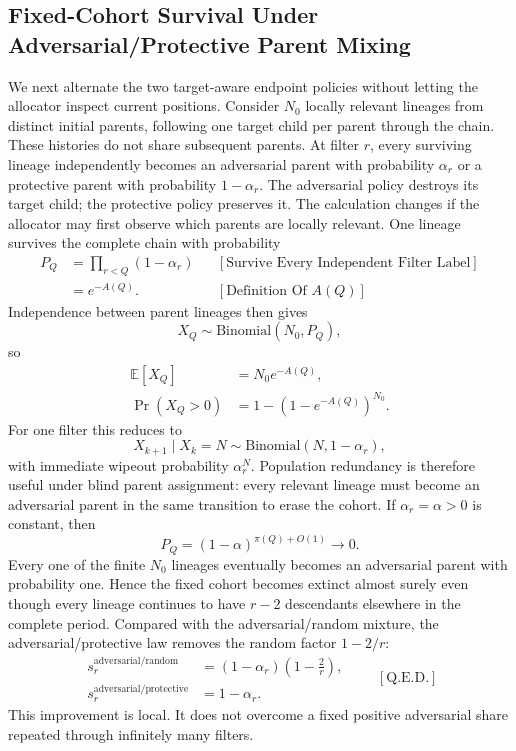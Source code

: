 \subsection{Fixed-Cohort Survival Under Adversarial/Protective Parent Mixing}
We next alternate the two target-aware endpoint policies without letting the allocator inspect current positions. Consider $N_0$ locally relevant lineages from distinct initial parents, following one target child per parent through the chain. These histories do not share subsequent parents. At filter $r$, every surviving lineage independently becomes an adversarial parent with probability $\alpha_r$ or a protective parent with probability $1-\alpha_r$. The adversarial policy destroys its target child; the protective policy preserves it. The calculation changes if the allocator may first observe which parents are locally relevant.
One lineage survives the complete chain with probability
\begin{equation*}
\begin{aligned}
P_Q
&=\prod_{r < Q}(1-\alpha_r)
&&[\text{Survive Every Independent Filter Label}]\\
&=e^{-A(Q)}.
&&[\text{Definition Of }A(Q)]
\end{aligned}
\end{equation*}
Independence between parent lineages then gives
\begin{equation*}
X_Q\sim\text{Binomial}(N_0,P_Q),
\end{equation*}
so
\begin{equation*}
\begin{aligned}
\mathbb E[X_Q]&=N_0e^{-A(Q)},\\
\Pr(X_Q > 0)&=1-\left(1-e^{-A(Q)}\right)^{N_0}.
\end{aligned}
\end{equation*}
For one filter this reduces to
\begin{equation*}
X_{k+1}\mid X_k=N
\sim
\text{Binomial}(N,1-\alpha_r),
\end{equation*}
with immediate wipeout probability $\alpha_r^N$. Population redundancy is therefore useful under blind parent assignment: every relevant lineage must become an adversarial parent in the same transition to erase the cohort.
If $\alpha_r=\alpha > 0$ is constant, then
\begin{equation*}
P_Q=(1-\alpha)^{\pi(Q)+O(1)}\longrightarrow0.
\end{equation*}
Every one of the finite $N_0$ lineages eventually becomes an adversarial parent with probability one. Hence the fixed cohort becomes extinct almost surely even though every lineage continues to have $r-2$ descendants elsewhere in the complete period.
Compared with the adversarial/random mixture, the adversarial/protective law removes the random factor $1-2/r$:
\begin{equation*}
\begin{aligned}
s_r^{\mathrm{adversarial/random}}
&=(1-\alpha_r)\left(1-\frac2r\right),\\
s_r^{\mathrm{adversarial/protective}}
&=1-\alpha_r.
\end{aligned}
\qquad[\text{Q.E.D.}]
\end{equation*}
This improvement is local. It does not overcome a fixed positive adversarial share repeated through infinitely many filters.
